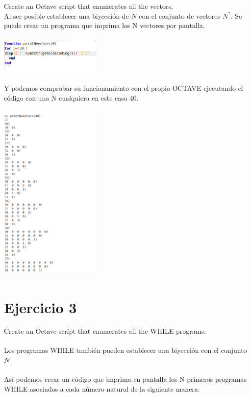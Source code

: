 \documentclass[fleqn, 10pt]{article}
\theoremstyle{plain}
\theoremstyle{definition}
\begin{document}
Create an Octave script that enumerates all the vectors.
\\

Al ser posible establecer una biyección de $N$ con el conjunto de vectores $N^*$. Se puede crear un programa que imprima los N vectores por pantalla.


\begin{center}
\includegraphics[width=5cm, height=2cm]{3.png}
\end{center}

Y podemos comprobar su funcionamiento con el propio OCTAVE ejecutando el código con una N cualquiera en este caso 40.


\begin{center}
\includegraphics[width=5cm, height=9cm]{4.png}
\end{center}

\section{Ejercicio 3}
Create an Octave script that enumerates all the WHILE programs.
\\
\\
Los programas WHILE también pueden establecer una biyección con el conjunto $N$
\\ 
\\
Así podemos crear un código que imprima en pantalla los N primeros programas WHILE asociados a cada número natural de la siguiente manera:
\end{document}
